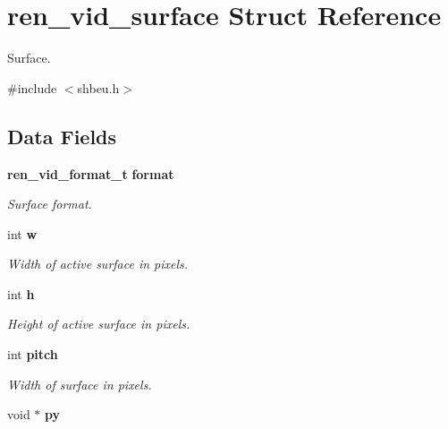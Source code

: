 \section{ren\_\-vid\_\-surface Struct Reference}
\label{structren__vid__surface}


Surface.  




{\ttfamily \#include $<$shbeu.h$>$}

\subsection*{Data Fields}
\begin{DoxyCompactItemize}
\item 
{\bf ren\_\-vid\_\-format\_\-t} {\bf format}\label{structren__vid__surface_a8e7a072220ff21ae63fafe8fcd4800e9}

\begin{DoxyCompactList}\small\item\em Surface format. \item\end{DoxyCompactList}\item 
int {\bf w}\label{structren__vid__surface_a5914aa588df3c6e501a41a1530905aae}

\begin{DoxyCompactList}\small\item\em Width of active surface in pixels. \item\end{DoxyCompactList}\item 
int {\bf h}\label{structren__vid__surface_a1aa46e32088db22c44aee9b3cec17a84}

\begin{DoxyCompactList}\small\item\em Height of active surface in pixels. \item\end{DoxyCompactList}\item 
int {\bf pitch}\label{structren__vid__surface_a8e42913432767986917ac7c85a18dd61}

\begin{DoxyCompactList}\small\item\em Width of surface in pixels. \item\end{DoxyCompactList}\item 
void $\ast$ {\bf py}\label{structren__vid__surface_a3b16e5d20f8d8ffc179834b64be13759}


\end{DoxyCompactItemize}
